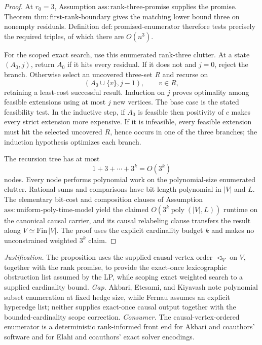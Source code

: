 \documentclass{article}
\begin{document}
\begin{proof}
At \(r_0=3\), Assumption
\(\mathrm{ass{:}rank\mbox{-}three\mbox{-}promise}\) supplies the promise.
Theorem \(\mathrm{thm{:}first\mbox{-}rank\mbox{-}boundary}\) gives the
matching lower bound three on nonempty residuals.  Definition
\(\mathrm{def{:}promised\mbox{-}enumerator}\) therefore tests precisely
the required triples, of which there are \(O(n^3)\).

For the scoped exact search, use this enumerated rank-three clutter.  At a
state \((A_0,j)\), return \(A_0\) if it hits every residual.  If it does
not and \(j=0\), reject the branch.  Otherwise select an uncovered
three-set \(R\) and recurse on
\[
 (A_0\cup\{v\},j-1),
 \qquad v\in R,
\]
retaining a least-cost successful result.  Induction on \(j\) proves
optimality among feasible extensions using at most \(j\) new vertices.
The base case is the stated feasibility test.  In the inductive step, if
\(A_0\) is feasible then positivity of \(c\) makes every strict extension
more expensive.  If it is infeasible, every feasible extension must hit
the selected uncovered \(R\), hence occurs in one of the three branches;
the induction hypothesis optimizes each branch.

The recursion tree has at most
\[
 1+3+\cdots+3^k=O(3^k)
\]
nodes.  Every node performs polynomial work on the polynomial-size
enumerated clutter.  Rational sums and comparisons have bit length
polynomial in \(|V|\) and \(L\).  The elementary bit-cost and composition
clauses of Assumption
\(\mathrm{ass{:}uniform\mbox{-}poly\mbox{-}time\mbox{-}model}\) yield the
claimed \(O(3^k\operatorname{poly}(|V|,L))\) runtime on the canonical
causal carrier, and its causal relabeling clause transfers the result along
\(V\simeq\mathrm{Fin}\,|V|\).  The proof uses the explicit cardinality
budget \(k\) and makes no unconstrained weighted \(3^k\) claim.
\end{proof}
\par\smallskip\noindent \textit{Justification.} The proposition uses the supplied causal-vertex order \(\triangleleft_V\) on \(V\), together with the rank promise, to provide the exact-once lexicographic obstruction list assumed by the LP, while scoping exact weighted search to a supplied cardinality bound. \textit{Gap.} Akbari, Etesami, and Kiyavash note polynomial subset enumeration at fixed hedge size, while Fernau assumes an explicit hyperedge list; neither supplies exact-once causal output together with the bounded-cardinality scope correction. \textit{Consumer.} The causal-vertex-ordered enumerator is a deterministic rank-informed front end for Akbari and coauthors' software and for Elahi and coauthors' exact solver encodings.
\end{document}
